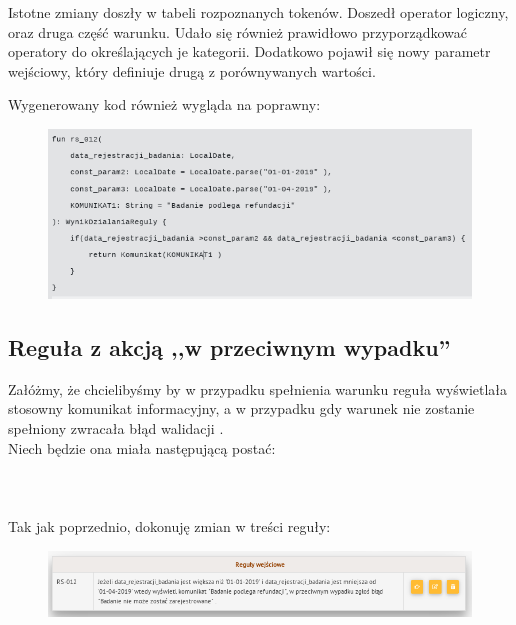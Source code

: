 Istotne zmiany doszły w tabeli rozpoznanych tokenów. Doszedł operator logiczny, oraz druga część warunku. Udało się również prawidłowo przyporządkować operatory do określających je kategorii. Dodatkowo pojawił się nowy parametr wejściowy, który definiuje drugą z porównywanych wartości. 

Wygenerowany kod również wygląda na poprawny:
\begin{figure}[H]
	\centering
	\includegraphics[scale=0.8]{img/app-eksperymenty/p2-3.png}
\end{figure}

\subsection{Reguła z akcją ,,w przeciwnym wypadku''}
Załóżmy, że chcielibyśmy by  w przypadku spełnienia warunku reguła wyświetlała stosowny komunikat informacyjny, a w przypadku gdy warunek nie zostanie spełniony zwracała błąd walidacji . \\
Niech będzie ona miała następującą postać:
\\ \\
\\ \\
Tak jak poprzednio, dokonuję zmian w treści reguły:
\begin{figure}[H]
	\centering
	\includegraphics[scale=0.8]{img/app-eksperymenty/p3-1.png}
\end{figure}


